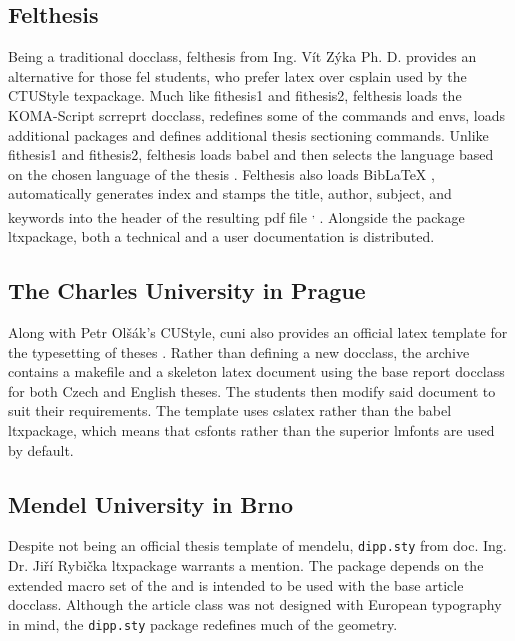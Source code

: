 \documentclass[12pt,twoside,cover,color,table]%
  {fithesis3/fithesis3/fithesis3} %
\begin{document}
  \subsection{Felthesis}\label{sec:felthesis}
  Being a traditional \gls{docclass}, felthesis from Ing. Vít Zýka
  Ph. D. provides an alternative for those \gls{fel} students, who
  prefer \gls{latex} over \gls{csplain} used by the CTUStyle
  \gls{texpackage}. Much like \textsf{fithesis1} and
  \textsf{fithesis2}, felthesis loads the KOMA-Script scrreprt
  \gls{docclass}, redefines some of the commands and \glspl{env},
  loads additional packages and defines additional thesis
  sectioning commands. Unlike \textsf{fithesis1} and
  \textsf{fithesis2}, felthesis loads babel and then selects the
  language based on the chosen language of the thesis
  \cite[lines~687--691]{felthesisCode}. Felthesis also loads Bib\LaTeX\pending{}
  \cite[line~722]{felthesisCode}, automatically generates
  index\pending{} \cite[line~763]{felthesisCode} and stamps the
  title, author, subject, and keywords into the header of the
  resulting \gls{pdf} file \cite[lines~959--971]{felthesisCode}
  \label{pdf-stamping}\textsuperscript{,}
  . Alongside the package
  \gls{ltxpackage}, both a technical \cite{felthesisCode} and a
  user documentation \cite{felthesis} is
  distributed\pending{}.

  \subsection{The Charles University in Prague}
  Along with Petr Olšák's CUStyle, \gls{cuni} also provides an
  official \gls{latex} template for the typesetting of theses
  \cite{cunisablona}. Rather than defining a new \gls{docclass},
  the archive contains a \gls{makefile} and a skeleton \gls{latex}
  document using the base report \gls{docclass} for both Czech and
  English theses. The students then modify said document to suit
  their requirements. The template uses \gls{cslatex} rather than
  the babel \gls{ltxpackage}, which means that \gls{csfonts} rather
  than the superior \gls{lmfonts} \cite{cslatexvsbabel} are used by
  default.

  \subsection{Mendel University in Brno}
  \label{sec:dipp.sty}
  Despite not being an official thesis template of \gls{mendelu},
  \texttt{dipp.sty} from doc. Ing. Dr. Jiří Rybička
  \gls{ltxpackage} warrants a mention. The package depends on the
  extended macro set of the 
   and is intended to be used
  with the base article \gls{docclass}. Although the article class
  was not designed with European typography in mind, the
  \texttt{dipp.sty} package redefines much of the geometry.
\end{document}
